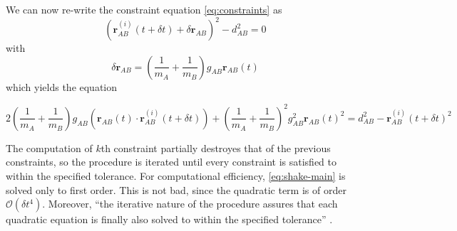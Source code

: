 \par We can now re-write the constraint equation \ref{eq:constraints} as 
\begin{equation*}
(\mathbf{r}^{(i)}_{AB}(t + \delta t) + \delta \mathbf{r}_{AB})^2 - d_{AB}^2 = 0
\end{equation*}
with
\begin{equation*}
\delta \mathbf{r}_{AB} = \left( \frac{1}{m_A} + \frac{1}{m_B} \right) g_{AB} \mathbf{r}_{AB}(t)
\end{equation*}
which yields the equation
\begin{tcolorbox}
	\begin{equation}
	\label{eq:shake-main}
	2\left( \frac{1}{m_A} + \frac{1}{m_B} \right) g_{AB} (\mathbf{r}_{AB}(t) \cdot \mathbf{r}^{(i)}_{AB}(t + \delta t)) + \left( \frac{1}{m_A} + \frac{1}{m_B} \right)^2 g_{AB}^2 \mathbf{r}_{AB}(t)^2 = d_{AB}^2 - \mathbf{r}^{(i)}_{AB}(t + \delta t)^2 
	\end{equation}
\end{tcolorbox}
\par The computation of $k$th constraint partially destroyes that of the previous constraints, so the procedure is iterated until every constraint is satisfied to within the specified tolerance. For computational efficiency, \ref{eq:shake-main} is solved only to first order. This is not bad, since the quadratic term is of order $\mathcal{O}(\delta t^4)$. Moreover, ``the iterative nature of the procedure assures that each quadratic equation is finally also solved to within the specified tolerance'' \cite{Shake}.